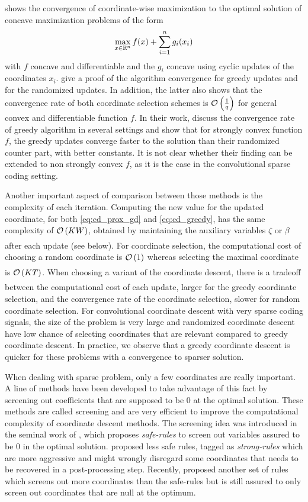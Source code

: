 \documentclass[../thesis.tex]{subfiles}
\begin{document}
	\citet{Tseng1988} shows the convergence of coordinate-wise maximization to the
	optimal solution of concave maximization problems of the form
	\[
		\max_{x\in{\mathbb{R}}^n}f(x) + \sum_{i=1}^n g_i(x_i)
	\]
	with $f$ concave and differentiable and the $g_i$ concave using cyclic updates of
	the coordinates $x_i$. \citet{Osher2009} give a proof of the algorithm convergence
	for greedy updates and \citet{Nesterov2010} for the randomized updates. In addition,
	the latter also shows that the convergence rate of both coordinate selection schemes
	is $\underset{}{\mathcal O}\left(\frac{1}{q}\right)$ for general convex and differentiable function $f$. In their
	work, \citet{Nutini} discuss the convergence rate of greedy algorithm in several
	settings and show that for strongly convex function $f$, the greedy updates converge
	faster to the solution than their randomized counter part, with better constants.
	It is not clear whether their finding can be extended to non strongly convex $f$,
	as it is the case in the convolutional sparse coding setting.

	Another important aspect of comparison between those methods is the complexity of
	each iteration. Computing the new value for the updated coordinate, for both
	\autoref{eq:cd_prox_gd} and \autoref{eq:cd_greedy}, has the same complexity of
	$\underset{}{\mathcal O}\left(KW\right)$, obtained by maintaining the auxiliary variables $\zeta$ or $\beta$ after
	each update (see below). For coordinate	selection, the computational cost of choosing
	a random coordinate is $\underset{}{\mathcal O}\left(1\right)$ whereas selecting the maximal coordinate is $\underset{}{\mathcal O}\left(KT\right)$.
	When choosing a variant of the coordinate descent, there is a tradeoff between the
	computational cost of each update, larger for the greedy coordinate selection, and
	the convergence rate of the coordinate selection, slower for random coordinate
	selection. For convolutional coordinate descent with very sparse coding signals,
	the size of the problem is very large and randomized coordinate descent have low
	chance of selecting coordinates that are relevant compared to greedy coordinate descent.
	In practice, we observe that a greedy coordinate descent is quicker for these problems
	with a convergence to sparser solution.


	When dealing with sparse problem, only a few coordinates are really important. A line of
	methods have been developed to take advantage of this fact by screening out coefficients
	that are supposed to be 0 at the optimal solution. These methods are called screening
	and are very efficient to improve the computational complexity of coordinate descent methods.
	The screening idea was introduced in the seminal work of \citet{Ghaoui2012},
	which proposes \emph{safe-rules} to screen out variables assured to be 0 in the optimal
	solution. \citet{Tibshirani2012} proposed less safe rules, tagged as \emph{strong-rules}
	which are more aggressive and might wrongly disregard some coordinates that needs to be
	recovered in a post-processing step. Recently, \citet{Fercoq2015} proposed another set
	of rules which screens out more coordinates than the safe-rules but is still assured to
	only screen out coordinates that are null at the optimum.
\end{document}
